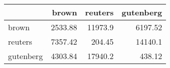 \begin{tabular}{lrrr}
\hline
           &   brown &   reuters &   gutenberg \\
\hline
 brown     & 2533.88 &  11973.9  &     6197.52 \\
 reuters   & 7357.42 &    204.45 &    14140.1  \\
 gutenberg & 4303.84 &  17940.2  &      438.12 \\
\hline
\end{tabular}